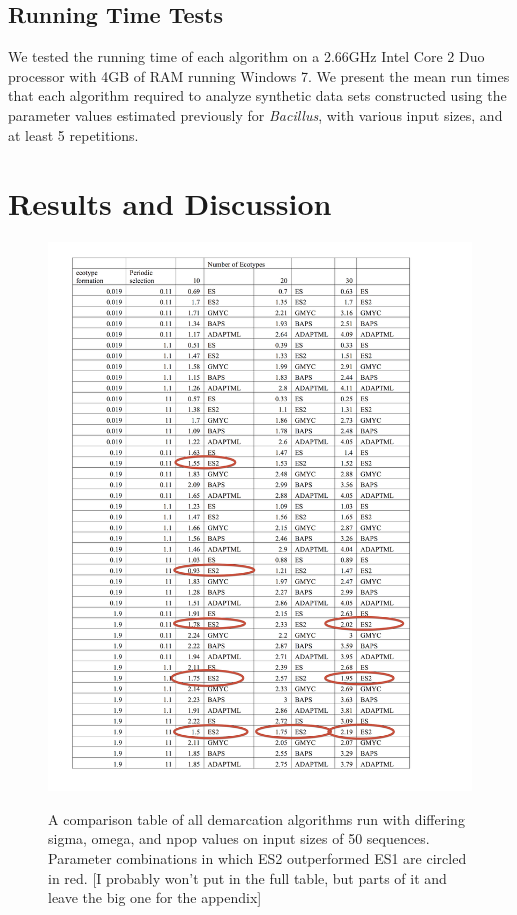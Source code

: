 \subsection*{Running Time Tests}
We tested the running time of each algorithm on a 2.66GHz Intel Core 2 Duo processor with 4GB of RAM running Windows 7.
We present the mean run times that each algorithm required to analyze synthetic data sets constructed using the parameter values estimated previously for \emph{Bacillus}, with various input sizes, and at least 5 repetitions.

\section{Results and Discussion}

\begin{figure}[h!]
  \caption[Demarcation comparison table for small inputs (nu = 50).]{A comparison table of all demarcation algorithms run with differing sigma, omega, and npop values on input sizes of 50 sequences. Parameter combinations in which ES2 outperformed ES1 are circled in red. [I probably won't put in the full table, but parts of it and leave the big one for the appendix]}
  \centering
    \includegraphics{images/ComparisonTable1.png}
    \label{fig:ComparisonSmall}
\end{figure}

